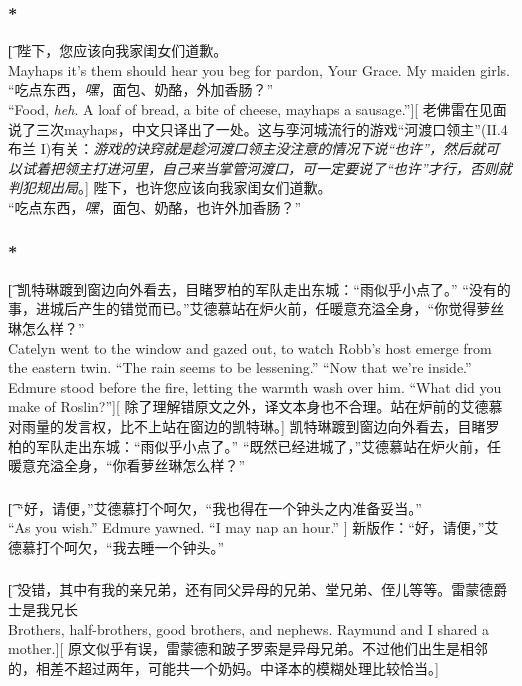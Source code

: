 \documentclass[12pt,a4paper]{article}
\begin{document}
\subsubsection{\color{red}*}\t[
	 陛下，您应该向我家闺女们道歉。\\
	 Mayhaps it's them should hear you beg for pardon, Your Grace. My maiden girls.\\
	 “吃点东西，\emph{嘿}，面包、奶酪，外加香肠？”\\
	 “Food, \emph{heh}. A loaf of bread, a bite of cheese, mayhaps a sausage.”][
	 老佛雷在见面说了三次mayhaps，中文只译出了一处。这与孪河城流行的游戏“河渡口领主”(II.4  布兰 I)有关：\emph{游戏的诀窍就是趁河渡口领主没注意的情况下说“也许”，然后就可以试着把领主打进河里，自己来当掌管河渡口，可一定要说了“也许”才行，否则就判犯规出局}。]
	 陛下，也许您应该向我家闺女们道歉。\\
	 “吃点东西，\emph{嘿}，面包、奶酪，也许外加香肠？”
	 
\subsubsection{\color{red}*}\t[	 
	凯特琳踱到窗边向外看去，目睹罗柏的军队走出东城：“雨似乎小点了。”
	“没有的事，进城后产生的错觉而已。”艾德慕站在炉火前，任暖意充溢全身，“你觉得萝丝琳怎么样？”\\	 
	 Catelyn went to the window and gazed out, to watch Robb's host emerge from the eastern twin. “The rain seems to be lessening.”
	 “Now that we're inside.” Edmure stood before the fire, letting the warmth wash over him. “What did you make of Roslin?”][
	 除了理解错原文之外，译文本身也不合理。站在炉前的艾德慕对雨量的发言权，比不上站在窗边的凯特琳。]
	 凯特琳踱到窗边向外看去，目睹罗柏的军队走出东城：“雨似乎小点了。”
	 “既然已经进城了，”艾德慕站在炉火前，任暖意充溢全身，“你看萝丝琳怎么样？”
	 
\subsubsection{}\t[
	“好，请便，”艾德慕打个呵欠，“我也得在一个钟头之内准备妥当。”\\
	“As you wish.” Edmure yawned. “I may nap an hour.” ]
	新版作：“好，请便，”艾德慕打个呵欠，“我去睡一个钟头。”

\subsubsection{}\t[
	没错，其中有我的亲兄弟，还有同父异母的兄弟、堂兄弟、侄儿等等。雷蒙德爵士是我兄长\\
	Brothers, half-brothers, good brothers, and nephews. Raymund and I shared a mother.][
	原文似乎有误，雷蒙德和跛子罗索是异母兄弟。不过他们出生是相邻的，相差不超过两年，可能共一个奶妈。中译本的模糊处理比较恰当。]
	
\end{document}
